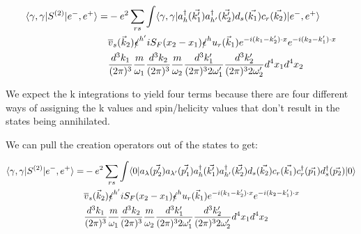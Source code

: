 \documentclass[a4]{article}
\begin{document}
\begin{framed}
            \begin{equation}
                \begin{aligned}
                    \langle \gamma, \gamma | S^{(2)} | e^{-}, e^{+} \rangle = & - e^{2} \sum_{r s} \int \langle \gamma, \gamma |a^{\dagger}_{h} (\vec{k'_1}) a^{\dagger}_{h'} (\vec{k'_2}) d_{s} (\vec{k_1}) c_{r} (\vec{k_2})| e^{-}, e^{+} \rangle \\
                    & \overline{v}_{s} (\vec{k}_2) \slashed{\epsilon}^{h'} i S_{F} (x_2 - x_1) \slashed{\epsilon}^{h} u_{r} (\vec{k}_1) e^{- i (k_1 - k'_2) \cdot x} e^{- i (k_2 - k'_1) \cdot x} \\
                    & \frac{d^3 k_1}{(2 \pi)^{3}} \frac{m}{\omega_1} \frac{d^3 k_2}{(2 \pi)^{3}} \frac{m}{\omega_2} \frac{d^3 k'_1}{(2 \pi)^{3} 2 \omega'_1} \frac{d^3 k'_2}{(2 \pi)^{3} 2 \omega'_2} d^4 x_1 d^4 x_2
                \end{aligned}
            \end{equation}

            \begin{framed}
                We expect the k integrations to yield four terms because there are four different ways of assigning the k values and spin/helicity
                values that don't result in the states being annihilated.
            \end{framed}

            We can pull the creation operators out of the states to get:

            \begin{equation}
                \begin{aligned}
                    \langle \gamma, \gamma | S^{(2)} | e^{-}, e^{+} \rangle = & - e^{2} \sum_{r s} \int \langle 0 |a_{\lambda} (\vec{p'_2}) a_{\lambda'} (\vec{p'_1}) a^{\dagger}_{h} (\vec{k'_1}) a^{\dagger}_{h'} (\vec{k'_2}) d_{s} (\vec{k_2}) c_{r} (\vec{k_1}) c^{\dagger}_{r} (\vec{p_1}) d^{\dagger}_{s} (\vec{p_2})| 0 \rangle \\
                    & \overline{v}_{s} (\vec{k}_2) \slashed{\epsilon}^{h'} i S_{F} (x_2 - x_1) \slashed{\epsilon}^{h} u_{r} (\vec{k}_1) e^{- i (k_1 - k'_2) \cdot x} e^{- i (k_2 - k'_1) \cdot x} \\
                    & \frac{d^3 k_1}{(2 \pi)^{3}} \frac{m}{\omega_1} \frac{d^3 k_2}{(2 \pi)^{3}} \frac{m}{\omega_2} \frac{d^3 k'_1}{(2 \pi)^{3} 2 \omega'_1} \frac{d^3 k'_2}{(2 \pi)^{3} 2 \omega'_2} d^4 x_1 d^4 x_2
                \end{aligned}
            \end{equation}


\end{framed}
\end{document}
